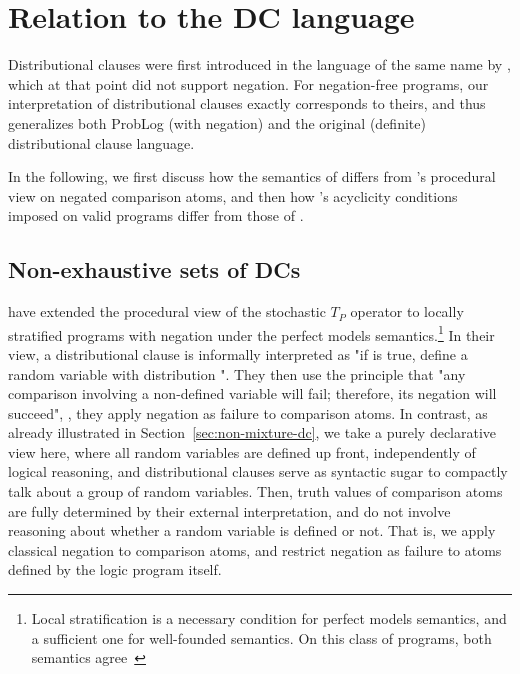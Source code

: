 

\section{Relation to the DC language}\label{sec:dcproblog-dc}

Distributional clauses were first introduced in the language of the same name  by \cite{gutmann2011magic}, which at that point did not support negation. For negation-free programs, our interpretation of distributional clauses exactly corresponds to theirs, and \dcproblogsty thus generalizes both ProbLog (with negation) and the original (definite) distributional clause language.


In the following, we first discuss how the semantics of \dcproblogsty differs from \cite{nitti2016probabilistic}'s procedural view on negated comparison atoms, and then how \dcproblogsty's acyclicity conditions imposed on valid programs differ from those of \cite{gutmann2011magic}.


\subsection{Non-exhaustive sets of DCs}\label{sec:proc-nitti}
\cite{nitti2016probabilistic}  have extended the procedural view of the stochastic $T_P$ operator to locally stratified programs with negation under the perfect models semantics.\footnote{Local stratification is a necessary condition for perfect models semantics, and a sufficient one for well-founded semantics. On this class of programs, both semantics agree~\citep{van1991well}} In their view, a distributional clause  is informally interpreted  as "if  is true, define a random variable  with distribution ". They then use the principle that "any comparison involving a non-defined variable will fail; therefore, its negation will succeed", \ie, they apply negation as failure to comparison atoms. 
In contrast, as already illustrated in Section~\ref{sec:non-mixture-dc}, we take a purely declarative view here, where all random variables are defined up front, independently of logical reasoning, and distributional clauses serve as syntactic sugar to compactly talk about a group of random variables. Then, truth values of comparison atoms are fully determined by their external interpretation, and do not involve reasoning about whether a random variable is defined or not. That is, we apply classical negation to comparison atoms, and restrict negation as failure to atoms defined by the logic program itself.

